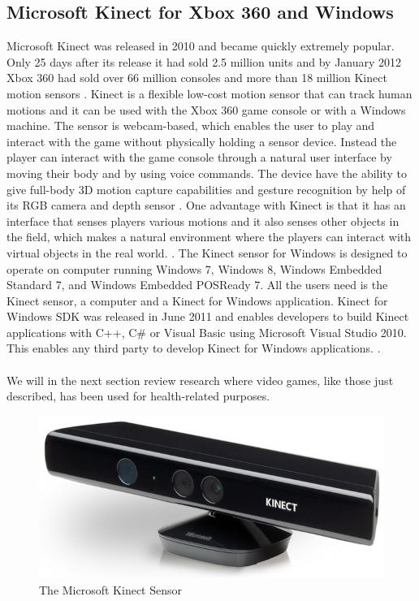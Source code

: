 \subsection{Microsoft Kinect for Xbox 360 and Windows}
Microsoft Kinect was released in 2010 and became quickly extremely popular. Only 25 days after its release it had sold 2.5 million units and by January 2012 Xbox 360 had sold over 66 million consoles and more than 18 million Kinect motion sensors \cite{consoles} \cite{kinectsold}. Kinect is a flexible low-cost motion sensor that can track human motions and it can be used with the Xbox 360 game console or with a Windows machine.  The sensor is webcam-based, which enables the user to play and interact with the game without physically holding a sensor device. Instead the player can interact with the game console through a natural user interface by moving their body and by using voice commands. The device have the ability to give full-body 3D motion capture capabilities and gesture recognition by help of its RGB camera and depth sensor \cite{kinect}. One advantage with Kinect is that it has an interface that senses players various motions and it also senses other objects in the field, which makes a natural environment where the players can interact with virtual objects in the real world. \cite{comparison}. The Kinect sensor for Windows is designed to operate on computer running Windows 7, Windows 8, Windows Embedded Standard 7, and Windows Embedded POSReady 7. All the users need is the Kinect sensor, a computer and a Kinect for Windows application. Kinect for Windows SDK was released in June 2011 and enables developers to build Kinect applications with C++, C\# or Visual Basic using Microsoft Visual Studio 2010. This enables any third party to develop Kinect for Windows applications. \cite{kinectwindows}.\\ \\
We will in the next section review research where video games, like those just described, has been used for health-related purposes. 
\begin{figure}[h!]
\begin{center}
\includegraphics[scale=0.3]{kinect}
\caption[Kinect Sensor]{The Microsoft Kinect Sensor}
\label{fig:KinectSensor}
\end{center}
\end{figure}

